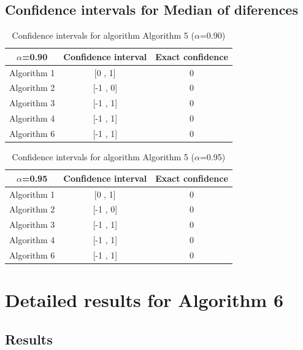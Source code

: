 \documentclass[a4paper,10pt]{article}
\begin{document}
\subsection{Confidence intervals for Median of diferences}

\begin{table}[!htp]
\centering\small
\begin{tabular}{
|c|c|c|}
\hline
 $\alpha$=0.90 & Confidence interval & Exact confidence \\ \hline 
Algorithm 1 & [0 , 1] & 0\\ \hline 
Algorithm 2 & [-1 , 0] & 0\\ \hline 
Algorithm 3 & [-1 , 1] & 0\\ \hline 
Algorithm 4 & [-1 , 1] & 0\\ \hline 
Algorithm 6 & [-1 , 1] & 0\\ \hline 

\end{tabular}
\caption{Confidence intervals for algorithm Algorithm 5 ($\alpha$=0.90)}
\end{table}
\begin{table}[!htp]
\centering\small
\begin{tabular}{
|c|c|c|}
\hline
 $\alpha$=0.95 & Confidence interval & Exact confidence \\ \hline 
Algorithm 1 & [0 , 1] & 0\\ \hline 
Algorithm 2 & [-1 , 0] & 0\\ \hline 
Algorithm 3 & [-1 , 1] & 0\\ \hline 
Algorithm 4 & [-1 , 1] & 0\\ \hline 
Algorithm 6 & [-1 , 1] & 0\\ \hline 

\end{tabular}
\caption{Confidence intervals for algorithm Algorithm 5 ($\alpha$=0.95)}
\end{table}

 \clearpage 


\section{Detailed results for Algorithm 6}


\subsection{Results}
\end{document}
